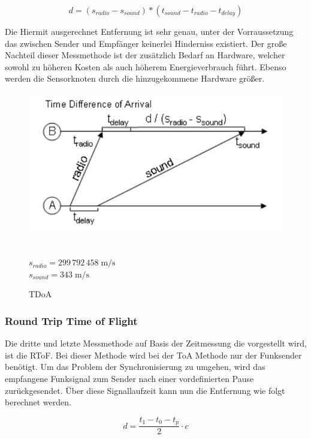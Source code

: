\begin{framed}
\begin{equation}
  \label{eq:TDoA}
    d = (s_{radio} - s_{sound}) * (t_{sound} - t_{radio} - t_{delay})
\end{equation}
\end{framed}

Die Hiermit ausgerechnet Entfernung ist sehr genau, unter der Vorraussetzung das zwischen Sender und Empfänger keinerlei Hinderniss existiert. Der große Nachteil dieser Messmethode ist der zusätzlich Bedarf an Hardware, welcher sowohl zu höheren Kosten als auch höherem Energieverbrauch führt. Ebenso werden die Sensorknoten durch die hinzugekommene Hardware größer.
\begin{figure}[h!]
  \centering
  \includegraphics[scale=0.5]{img/tdoa1.png}\\
  \cite{bachrach}\\~\\
  $s_{radio}=299\,792\,458\;\mathrm{m/s}$\\
  $s_{sound}=          343\;\mathrm{m/s}$
  \label{fig:TDoA}
  \caption{TDoA}
\end{figure}

\subsubsection{Round Trip Time of Flight}
Die dritte und letzte Messmethode auf Basis der Zeitmessung die
vorgestellt wird, ist die \ac{RToF}. Bei dieser Methode wird bei der
ToA Methode nur der Funksender benötigt. Um das Problem der
Synchronisierung zu umgehen, wird das empfangene Funksignal zum Sender
nach einer vordefinierten Pause zurückgesendet. Über diese
Signallaufzeit kann nun die Entfernung wie folgt berechnet werden.
\begin{framed}
\begin{equation}
  \label{eq:RToF}
    d = \frac{t_{1} - t_{0} - t_{p}}{2} \cdot c
\end{equation}
\end{framed}

